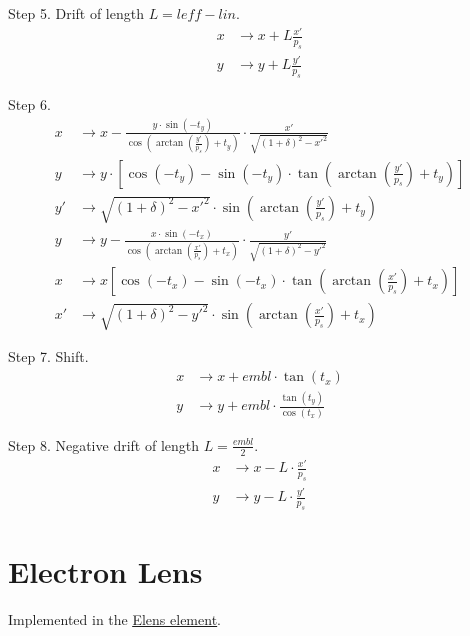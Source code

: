 Step 5. Drift of length $L=leff-lin$.
\begin{align*}
    x &\to x + L \frac{x'}{p_s} \\
    y &\to y + L \frac{y'}{p_s}
\end{align*}

Step 6.
\begin{align*}
	x &\to x - \frac{y\cdot\sin(-t_y)}{
    \cos\left(\arctan\left(\frac{y'}{p_s}\right)+t_y\right)}\cdot
    \frac{x'}{\sqrt{(1+\delta)^2-x'^2}} \\
    y &\to y\cdot\left[\cos(-t_y)-\sin(-t_y)\cdot\tan\left(
    \arctan\left(\frac{y'}{p_s}\right)+t_y\right)\right] \\
    y' &\to \sqrt{(1+\delta)^2-x'^2}\cdot\sin\left(
    \arctan\left(\frac{y'}{p_s}\right)+t_y\right) \\
    y &\to y- \frac{x\cdot\sin(-t_x)}{\cos\left(\arctan\left(\frac{x'}{p_s}\right)
    +t_x\right)} \cdot\frac{y'}{\sqrt{(1+\delta)^2-y'^2}} \\
    x &\to x \left[ \cos(-t_x) - \sin(-t_x)\cdot\tan\left(
    \arctan\left(\frac{x'}{p_s}\right)+t_x\right) \right] \\
    x' &\to \sqrt{(1+\delta)^2-y'^2}\cdot\sin\left(\arctan\left(
    \frac{x'}{p_s}\right)+t_x\right)
\end{align*}

Step 7. Shift.
\begin{align*}
    x &\to x + embl\cdot \tan(t_x) \\
    y &\to y + embl\cdot\frac{\tan(t_y)}{\cos(t_x)}
\end{align*}

Step 8. Negative drift of length $L=\frac{embl}{2}$.
\begin{align*}
    x &\to x - L\cdot \frac{x'}{p_s} \\
    y &\to y - L\cdot \frac{y'}{p_s}
\end{align*}


\section{Electron Lens}

Implemented in the \href{https://xsuite.readthedocs.io/en/latest/apireference.html#elens}{\underline{Elens element}}.

\label{elense}

